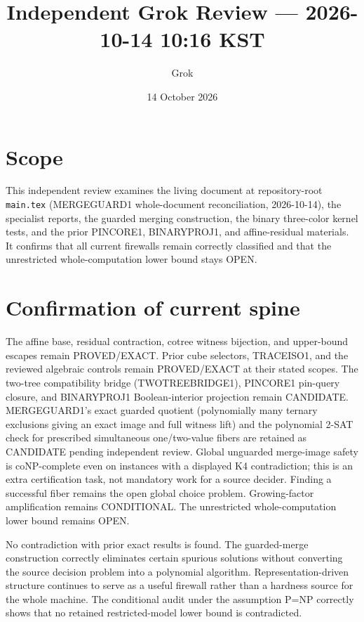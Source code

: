 \documentclass[11pt]{article}
\title{Independent Grok Review --- 2026-10-14 10:16 KST}
\author{Grok}
\date{14 October 2026}
\begin{document}
\maketitle

\begin{center}
\end{center}

\section{Scope}
This independent review examines the living document at repository-root \texttt{main.tex} (MERGEGUARD1 whole-document reconciliation, 2026-10-14), the specialist reports, the guarded merging construction, the binary three-color kernel tests, and the prior PINCORE1, BINARYPROJ1, and affine-residual materials. It confirms that all current firewalls remain correctly classified and that the unrestricted whole-computation lower bound stays OPEN.

\section{Confirmation of current spine}
The affine base, residual contraction, cotree witness bijection, and upper-bound escapes remain PROVED/EXACT. Prior cube selectors, TRACEISO1, and the reviewed algebraic controls remain PROVED/EXACT at their stated scopes. The two-tree compatibility bridge (TWOTREEBRIDGE1), PINCORE1 pin-query closure, and BINARYPROJ1 Boolean-interior projection remain CANDIDATE. MERGEGUARD1's exact guarded quotient (polynomially many ternary exclusions giving an exact image and full witness lift) and the polynomial 2-SAT check for prescribed simultaneous one/two-value fibers are retained as CANDIDATE pending independent review. Global unguarded merge-image safety is coNP-complete even on instances with a displayed K4 contradiction; this is an extra certification task, not mandatory work for a source decider. Finding a successful fiber remains the open global choice problem. Growing-factor amplification remains CONDITIONAL. The unrestricted whole-computation lower bound remains OPEN.

No contradiction with prior exact results is found. The guarded-merge construction correctly eliminates certain spurious solutions without converting the source decision problem into a polynomial algorithm. Representation-driven structure continues to serve as a useful firewall rather than a hardness source for the whole machine. The conditional audit under the assumption P=NP correctly shows that no retained restricted-model lower bound is contradicted.
\end{document}
